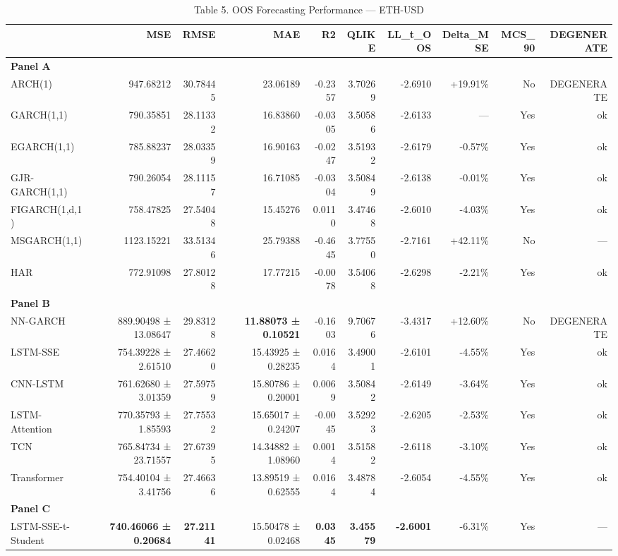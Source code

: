 \begin{table}[ht]
\centering
\caption{Table 5. OOS Forecasting Performance — ETH-USD}
\label{tab:oos_eth-usd}
\begin{tabular}{lrrrrrrrrr}
\toprule
 & MSE & RMSE & MAE & R2 & QLIKE & LL_t_OOS & Delta_MSE & MCS_90 & DEGENERATE \\
\midrule
\multicolumn{10}{l}{\textbf{Panel A}} \\
ARCH(1) & 947.68212 & 30.78445 & 23.06189 & -0.2357 & 3.70269 & -2.6910 & +19.91\% & No & DEGENERATE \\
GARCH(1,1) & 790.35851 & 28.11332 & 16.83860 & -0.0305 & 3.50586 & -2.6133 & — & Yes & ok \\
EGARCH(1,1) & 785.88237 & 28.03359 & 16.90163 & -0.0247 & 3.51932 & -2.6179 & -0.57\% & Yes & ok \\
GJR-GARCH(1,1) & 790.26054 & 28.11157 & 16.71085 & -0.0304 & 3.50849 & -2.6138 & -0.01\% & Yes & ok \\
FIGARCH(1,d,1) & 758.47825 & 27.54048 & 15.45276 & 0.0110 & 3.47468 & -2.6010 & -4.03\% & Yes & ok \\
MSGARCH(1,1) & 1123.15221 & 33.51346 & 25.79388 & -0.4645 & 3.77550 & -2.7161 & +42.11\% & No & — \\
HAR & 772.91098 & 27.80128 & 17.77215 & -0.0078 & 3.54068 & -2.6298 & -2.21\% & Yes & ok \\
\multicolumn{10}{l}{\textbf{Panel B}} \\
NN-GARCH & 889.90498 ± 13.08647 & 29.83128 & \textbf{11.88073 ± 0.10521} & -0.1603 & 9.70676 & -3.4317 & +12.60\% & No & DEGENERATE \\
LSTM-SSE & 754.39228 ± 2.61510 & 27.46620 & 15.43925 ± 0.28235 & 0.0164 & 3.49001 & -2.6101 & -4.55\% & Yes & ok \\
CNN-LSTM & 761.62680 ± 3.01359 & 27.59759 & 15.80786 ± 0.20001 & 0.0069 & 3.50842 & -2.6149 & -3.64\% & Yes & ok \\
LSTM-Attention & 770.35793 ± 1.85593 & 27.75532 & 15.65017 ± 0.24207 & -0.0045 & 3.52923 & -2.6205 & -2.53\% & Yes & ok \\
TCN & 765.84734 ± 23.71557 & 27.67395 & 14.34882 ± 1.08960 & 0.0014 & 3.51582 & -2.6118 & -3.10\% & Yes & ok \\
Transformer & 754.40104 ± 3.41756 & 27.46636 & 13.89519 ± 0.62555 & 0.0164 & 3.48784 & -2.6054 & -4.55\% & Yes & ok \\
\multicolumn{10}{l}{\textbf{Panel C}} \\
LSTM-SSE-t-Student & \textbf{740.46066 ± 0.20684} & \textbf{27.21141} & 15.50478 ± 0.02468 & \textbf{0.0345} & \textbf{3.45579} & \textbf{-2.6001} & -6.31\% & Yes & — \\

\end{tabular}
\end{table}
